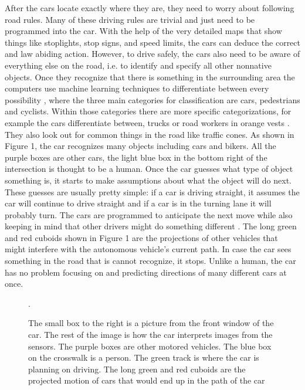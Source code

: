 \documentclass[11pt]{article}
\begin{document}
After the cars locate exactly where they are, they need to worry about following road rules. Many of these driving rules are trivial and just need to be programmed
into the car. With the help of the very detailed maps that show things like stoplights, stop signs, and speed limits, the cars can deduce the correct and
law abiding action. However, to drive safely, the cars also need to be aware of everything else on the road, i.e. to identify and specify all other nonnative objects. Once they recognize that there is something in the surrounding area the computers use machine learning techniques to differentiate between every possibility \cite{zhu2012object}, where the three main categories for classification are cars, pedestrians and cyclists.
Within those categories there are more specific categorizations, for example the cars differentiate between, trucks or road workers in orange vests \cite{zhu2012object}. They also look out for common things in the road like traffic cones. As shown in Figure 1, the car recognizes many objects including cars and bikers. All the purple boxes are other cars, the light blue box in the bottom right of the intersection is thought to be a human. Once the car guesses what type of object something is, it starts to make assumptions about what the object will do next. These guesses are usually pretty simple: if a car is driving straight, it assumes the car will continue to drive straight and if a car is in the turning lane it will probably turn. The cars are programmed to anticipate the next move while also keeping in mind that other drivers might do something different \cite{chrisurmson2016}. The long green and red cuboids shown in Figure 1 are the projections of other vehicles that might interfere with the autonomous vehicle's current path. In case the car sees something in the road that is cannot recognize, it stops. Unlike a human, the car has no problem focusing on and predicting directions of many different cars at once. 
\begin{figure}[!ht]
  \centering

\caption{The small box to the right is a picture from the front window of the car. The rest of the image is how the car interprets images from the sensors. The purple boxes are other motored vehicles. The blue box on the crosswalk is a person. The green track is where the car is planning on driving. The long green and red cuboids are the projected motion of cars that would end up in the  path of the car \cite{chrisurmson2016}}.
\end{figure}
\end{document}
